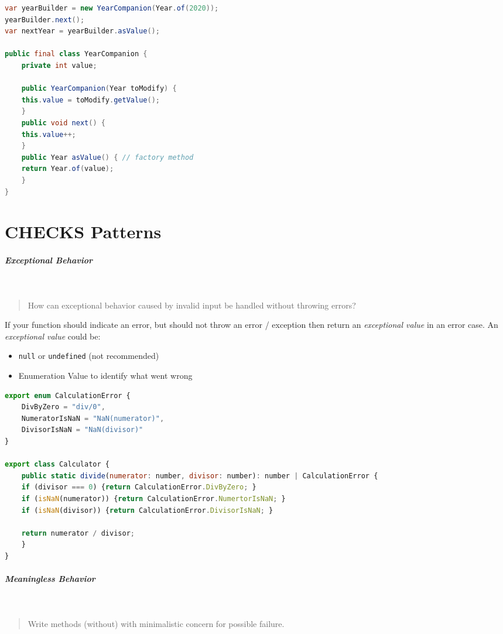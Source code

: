 \documentclass[11pt,twoside,landscape]{article}
\begin{document}
\begin{multicols}{3}
\begin{lstlisting}[language=java,label=lst:example-for-mutable-companion,caption={Example for Mutable Companion},captionpos=b,numbers=none]
var yearBuilder = new YearCompanion(Year.of(2020));
yearBuilder.next();
var nextYear = yearBuilder.asValue();

public final class YearCompanion {
    private int value;

    public YearCompanion(Year toModify) {
	this.value = toModify.getValue();
    }
    public void next() {
	this.value++;
    }
    public Year asValue() { // factory method
	return Year.of(value);
    }
}
\end{lstlisting}
\section{CHECKS Patterns}
\label{sec:orge7ff1d9}
\subparagraph{Exceptional Behavior} \
\label{sec:org67ab758}
\begin{quote}
How can exceptional behavior caused by invalid input be handled without throwing errors?
\end{quote}

If your function should indicate an error, but should not throw an error / exception then return an \emph{exceptional value} in an error case.
An \emph{exceptional value} could be:
\begin{itemize}
\item \texttt{null} or \texttt{undefined} (not recommended)
\item Enumeration Value to identify what went wrong
\end{itemize}


\begin{lstlisting}[language=js,label=lst:example-for-exceptional-behavior,caption={Example for Exceptional Behavior},captionpos=b,numbers=none]
export enum CalculationError {
    DivByZero = "div/0",
    NumeratorIsNaN = "NaN(numerator)",
    DivisorIsNaN = "NaN(divisor)"
}

export class Calculator {
    public static divide(numerator: number, divisor: number): number | CalculationError {
	if (divisor === 0) {return CalculationError.DivByZero; }
	if (isNaN(numerator)) {return CalculationError.NumertorIsNaN; }
	if (isNaN(divisor)) {return CalculationError.DivisorIsNaN; }

	return numerator / divisor;
    }
}
\end{lstlisting}
\subparagraph{Meaningless Behavior} \
\label{sec:orge63fe68}
\begin{quote}
Write methods (without) with minimalistic concern for possible failure.
\end{quote}


\end{multicols}
\end{document}
